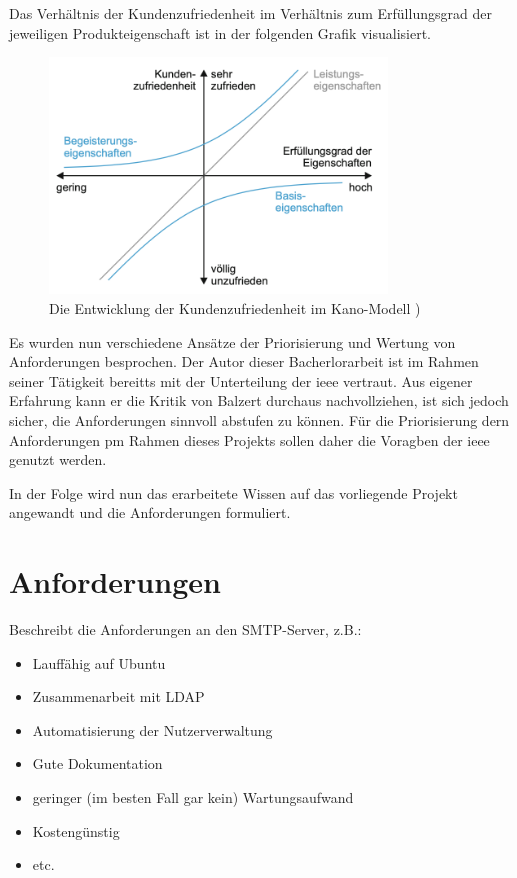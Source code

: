Das Verhältnis der Kundenzufriedenheit im Verhältnis zum Erfüllungsgrad der jeweiligen Produkteigenschaft ist in der folgenden Grafik visualisiert.

\begin{figure}[h]
  \centering
  \includegraphics[width=0.8\textwidth]{res/kano.png}
  \caption{Die Entwicklung der Kundenzufriedenheit im Kano-Modell \citep[][545]{Balzert2010})}
  \label{fig:Kanomodell}
\end{figure}

Es wurden nun verschiedene Ansätze der Priorisierung und Wertung von Anforderungen besprochen. Der Autor dieser Bacherlorarbeit ist im Rahmen seiner Tätigkeit bereitts mit der Unterteilung der \ac{ieee} vertraut. Aus eigener Erfahrung kann er die Kritik von Balzert durchaus nachvollziehen, ist sich jedoch sicher, die Anforderungen sinnvoll abstufen zu können. Für die Priorisierung dern Anforderungen pm Rahmen dieses Projekts sollen daher die Voragben der \ac{ieee} genutzt werden.

In der Folge wird nun das erarbeitete Wissen auf das vorliegende Projekt angewandt und die Anforderungen formuliert. 


\section{Anforderungen}
Beschreibt die Anforderungen an den SMTP-Server, z.B.:
\begin{itemize}
	\item Lauffähig auf Ubuntu
	\item Zusammenarbeit mit LDAP
	\item Automatisierung der Nutzerverwaltung
	\item Gute Dokumentation
	\item geringer (im besten Fall gar kein) Wartungsaufwand
	\item Kostengünstig
	\item etc.
\end{itemize}


